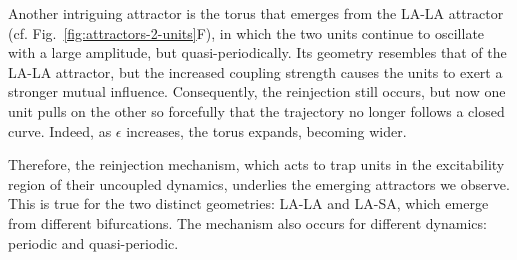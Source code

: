 Another intriguing attractor is the torus that emerges from the LA-LA attractor (cf. Fig.~\ref{fig:attractors-2-units}F), in which the two units continue to oscillate with a large amplitude, but quasi-periodically. Its geometry resembles that of the LA-LA attractor, but the increased coupling strength causes the units to exert a stronger mutual influence. Consequently, the reinjection still occurs, but now one unit pulls on the other so forcefully that the trajectory no longer follows a closed curve. Indeed, as $\epsilon$ increases, the torus expands, becoming wider.

Therefore, the reinjection mechanism, which acts to trap units in the excitability region of their uncoupled dynamics, underlies the emerging attractors we observe. This is true for the two distinct geometries: LA-LA and LA-SA, which emerge from different bifurcations. The mechanism also occurs for different dynamics: periodic and quasi-periodic.
%
